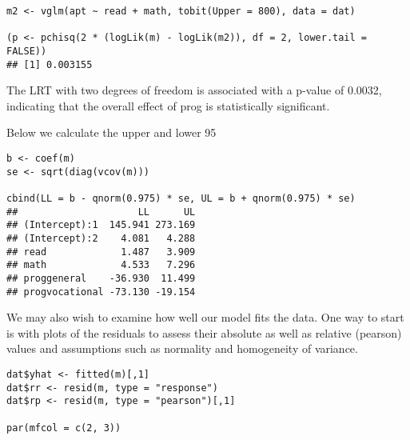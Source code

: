 \documentclass{beamer}
\begin{document}
\begin{frame}[fragile]
	\begin{framed}
		\begin{verbatim}
m2 <- vglm(apt ~ read + math, tobit(Upper = 800), data = dat)

(p <- pchisq(2 * (logLik(m) - logLik(m2)), df = 2, lower.tail = FALSE))
## [1] 0.003155
\end{verbatim}
\end{framed}
The LRT with two degrees of freedom is associated with a p-value of 0.0032, indicating that the overall effect of prog is statistically significant.

Below we calculate the upper and lower 95%
\end{frame}
\begin{frame}[fragile]
	\begin{framed}
		\begin{verbatim}
b <- coef(m)
se <- sqrt(diag(vcov(m)))

cbind(LL = b - qnorm(0.975) * se, UL = b + qnorm(0.975) * se)
##                     LL      UL
## (Intercept):1  145.941 273.169
## (Intercept):2    4.081   4.288
## read             1.487   3.909
## math             4.533   7.296
## proggeneral    -36.930  11.499
## progvocational -73.130 -19.154
\end{verbatim}
\end{framed}
\end{frame}
\begin{frame}[fragile]
We may also wish to examine how well our model fits the data. One way to start is with plots of the residuals to assess their absolute as well as relative (pearson) values and assumptions such as normality and homogeneity of variance.
\end{frame}
\begin{frame}[fragile]
	\begin{framed}
		\begin{verbatim}
dat$yhat <- fitted(m)[,1]
dat$rr <- resid(m, type = "response")
dat$rp <- resid(m, type = "pearson")[,1]

par(mfcol = c(2, 3))
\end{verbatim}
\end{framed}
\end{frame}
\end{document}
